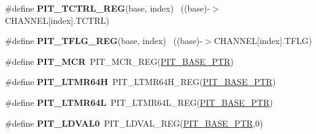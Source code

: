 \begin{DoxyCompactItemize}
\item 
\hypertarget{group___p_i_t___register___accessor___macros_ga4c2f72ad95fb4104612b319ce7a7d4d9}{}\#define {\bfseries P\+I\+T\+\_\+\+T\+C\+T\+R\+L\+\_\+\+R\+E\+G}(base,  index)                            ~((base)-\/$>$C\+H\+A\+N\+N\+E\+L\mbox{[}index\mbox{]}.T\+C\+T\+R\+L)\label{group___p_i_t___register___accessor___macros_ga4c2f72ad95fb4104612b319ce7a7d4d9}

\item 
\hypertarget{group___p_i_t___register___accessor___macros_ga79831c0452f96ca1b71292189ad382eb}{}\#define {\bfseries P\+I\+T\+\_\+\+T\+F\+L\+G\+\_\+\+R\+E\+G}(base,  index)                              ~((base)-\/$>$C\+H\+A\+N\+N\+E\+L\mbox{[}index\mbox{]}.T\+F\+L\+G)\label{group___p_i_t___register___accessor___macros_ga79831c0452f96ca1b71292189ad382eb}

\item 
\hypertarget{group___p_i_t___register___accessor___macros_gad6118acee6a1de4d21ceaae97156642b}{}\#define {\bfseries P\+I\+T\+\_\+\+M\+C\+R}~P\+I\+T\+\_\+\+M\+C\+R\+\_\+\+R\+E\+G(\hyperlink{group___p_i_t___peripheral_ga70be45f58402a8e6d2ce4df7b23aa41c}{P\+I\+T\+\_\+\+B\+A\+S\+E\+\_\+\+P\+T\+R})\label{group___p_i_t___register___accessor___macros_gad6118acee6a1de4d21ceaae97156642b}

\item 
\hypertarget{group___p_i_t___register___accessor___macros_ga48f7990fb994d993f7e3fda0293b0ccc}{}\#define {\bfseries P\+I\+T\+\_\+\+L\+T\+M\+R64\+H}~P\+I\+T\+\_\+\+L\+T\+M\+R64\+H\+\_\+\+R\+E\+G(\hyperlink{group___p_i_t___peripheral_ga70be45f58402a8e6d2ce4df7b23aa41c}{P\+I\+T\+\_\+\+B\+A\+S\+E\+\_\+\+P\+T\+R})\label{group___p_i_t___register___accessor___macros_ga48f7990fb994d993f7e3fda0293b0ccc}

\item 
\hypertarget{group___p_i_t___register___accessor___macros_gad74feae96488d1c1ae3c92af5e546359}{}\#define {\bfseries P\+I\+T\+\_\+\+L\+T\+M\+R64\+L}~P\+I\+T\+\_\+\+L\+T\+M\+R64\+L\+\_\+\+R\+E\+G(\hyperlink{group___p_i_t___peripheral_ga70be45f58402a8e6d2ce4df7b23aa41c}{P\+I\+T\+\_\+\+B\+A\+S\+E\+\_\+\+P\+T\+R})\label{group___p_i_t___register___accessor___macros_gad74feae96488d1c1ae3c92af5e546359}

\item 
\hypertarget{group___p_i_t___register___accessor___macros_ga7ec0541e320eaa3953407fd3f8ff3a89}{}\#define {\bfseries P\+I\+T\+\_\+\+L\+D\+V\+A\+L0}~P\+I\+T\+\_\+\+L\+D\+V\+A\+L\+\_\+\+R\+E\+G(\hyperlink{group___p_i_t___peripheral_ga70be45f58402a8e6d2ce4df7b23aa41c}{P\+I\+T\+\_\+\+B\+A\+S\+E\+\_\+\+P\+T\+R},0)\label{group___p_i_t___register___accessor___macros_ga7ec0541e320eaa3953407fd3f8ff3a89}


\end{DoxyCompactItemize}
